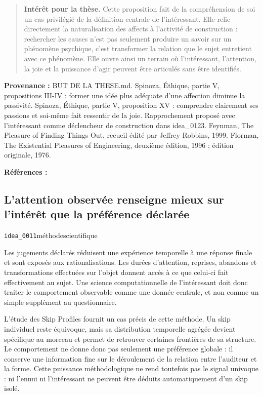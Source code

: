 \documentclass[10pt,a4paper]{article}
\begin{document}
\begin{quote}
\textbf{Intérêt pour la thèse.} Cette proposition fait de la compréhension de soi un cas privilégié de la définition centrale de l'intéressant. Elle relie directement la naturalisation des affects à l'activité de construction : rechercher les causes n'est pas seulement produire un savoir sur un phénomène psychique, c'est transformer la relation que le sujet entretient avec ce phénomène. Elle ouvre ainsi un terrain où l'intéressant, l'attention, la joie et la puissance d'agir peuvent être articulés sans être identifiés.
\end{quote}
{\footnotesize\color{metadata}\textbf{Provenance :} BUT DE LA THESE.md. Spinoza, Éthique, partie V, propositions III-IV : former une idée plus adéquate d'une affection diminue la passivité. Spinoza, Éthique, partie V, proposition XV : comprendre clairement ses passions et soi-même fait ressentir de la joie. Rapprochement proposé avec l'intéressant comme déclencheur de construction dans idea\_0123. Feynman, The Pleasure of Finding Things Out, recueil édité par Jeffrey Robbins, 1999. Florman, The Existential Pleasures of Engineering, deuxième édition, 1996 ; édition originale, 1976.\par}
{\footnotesize\color{metadata}\textbf{Références :} \parencite{spinoza1861oeuvres,macherey1995vieaffective,feynman1999pleasure,florman1996existential}\par}

\subsection{L'attention observée renseigne mieux sur l'intérêt que la préférence déclarée}
{\small\color{metadata} \texttt{idea\_0011}\quad\textbullet\quad méthode\quad\textbullet\quad scientifique\par}

Les jugements déclarés réduisent une expérience temporelle à une réponse finale et sont exposés aux rationalisations. Les durées d'attention, reprises, abandons et transformations effectuées sur l'objet donnent accès à ce que celui-ci fait effectivement au sujet. Une science computationnelle de l'intéressant doit donc traiter le comportement observable comme une donnée centrale, et non comme un simple supplément au questionnaire.

L'étude des Skip Profiles fournit un cas précis de cette méthode. Un skip individuel reste équivoque, mais sa distribution temporelle agrégée devient spécifique au morceau et permet de retrouver certaines frontières de sa structure. Le comportement ne donne donc pas seulement une préférence globale : il conserve une information fine sur le déroulement de la relation entre l'auditeur et la forme. Cette puissance méthodologique ne rend toutefois pas le signal univoque : ni l'ennui ni l'intéressant ne peuvent être déduits automatiquement d'un skip isolé.
\end{document}
